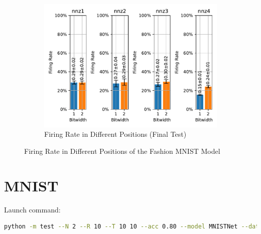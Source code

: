        \begin{figure}[H]
            \centering
            \ContinuedFloat
            \begin{subfigure}[H]{\textwidth}
                \centering
                \includegraphics[width=\textwidth]{../firerate/FashionMNIST/plots/fashionmnist_final_firerate.pdf}
                \caption{Firing Rate in Different Positions (Final Test)}
            \end{subfigure}
            \caption{Firing Rate in Different Positions of the Fashion MNIST Model}
        \end{figure}

    \section{MNIST}
    \label{appendix:firerate_mnist}
        Launch command: 
        \begin{lstlisting}[language=Bash, basicstyle=\small, breaklines=true]
python -m test --N 2 --R 10 --T 10 10 --acc 0.80 --model MNISTNet --data-path /scratch/zyi/codeSpace/data --dataset MNIST --batch-size 128 --opt adam --lr 2e-3 --lr-scheduler none --epochs 50 --lr-warmup-epochs 0 --output-dir /scratch/zyi/codeSpace/MultibitSpikes/firerate --mixup-alpha 0.0 --cutmix-alpha 0.0 --label-smoothing 0.0 --disable-amp
        \end{lstlisting}

